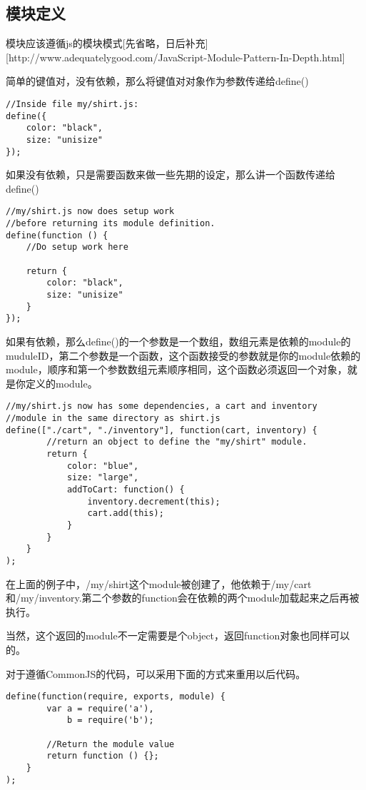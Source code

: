     \subsection{模块定义}

    模块应该遵循js的模块模式[先省略，日后补充][http://www.adequatelygood.com/JavaScript-Module-Pattern-In-Depth.html]

    简单的键值对，没有依赖，那么将键值对对象作为参数传递给define()
    \begin{lstlisting}
//Inside file my/shirt.js:
define({
    color: "black",
    size: "unisize"
});
    \end{lstlisting}

    如果没有依赖，只是需要函数来做一些先期的设定，那么讲一个函数传递给define()
    \begin{lstlisting}
//my/shirt.js now does setup work
//before returning its module definition.
define(function () {
    //Do setup work here

    return {
        color: "black",
        size: "unisize"
    }
});
    \end{lstlisting}

    如果有依赖，那么define()的一个参数是一个数组，数组元素是依赖的module的muduleID，第二个参数是一个函数，这个函数接受的参数就是你的module依赖的module，顺序和第一个参数数组元素顺序相同，这个函数必须返回一个对象，就是你定义的module。

    \begin{lstlisting}
//my/shirt.js now has some dependencies, a cart and inventory
//module in the same directory as shirt.js
define(["./cart", "./inventory"], function(cart, inventory) {
        //return an object to define the "my/shirt" module.
        return {
            color: "blue",
            size: "large",
            addToCart: function() {
                inventory.decrement(this);
                cart.add(this);
            }
        }
    }
);
    \end{lstlisting}

    在上面的例子中，/my/shirt这个module被创建了，他依赖于/my/cart和/my/inventory.第二个参数的function会在依赖的两个module加载起来之后再被执行。

    当然，这个返回的module不一定需要是个object，返回function对象也同样可以的。

    对于遵循CommonJS的代码，可以采用下面的方式来重用以后代码。

    \begin{lstlisting}
define(function(require, exports, module) {
        var a = require('a'),
            b = require('b');

        //Return the module value
        return function () {};
    }
);
    \end{lstlisting}

